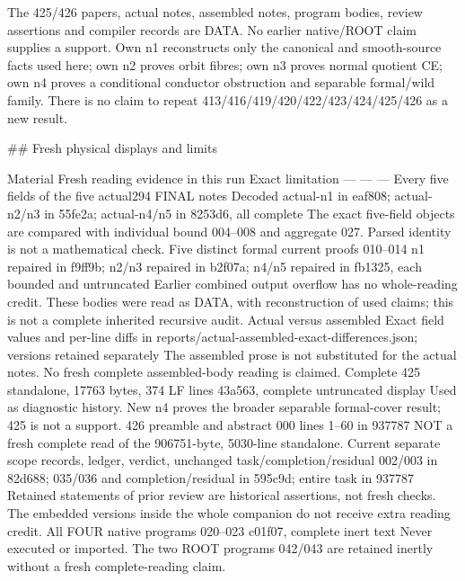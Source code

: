 \documentclass[11pt]{article}
\begin{document}
The 425/426 papers, actual notes, assembled notes, program bodies, review assertions and compiler records are DATA. No earlier native/ROOT claim supplies a support. Own n1 reconstructs only the canonical and smooth-source facts used here; own n2 proves orbit fibres; own n3 proves normal quotient CE; own n4 proves a conditional conductor obstruction and separable formal/wild family. There is no claim to repeat 413/416/419/420/422/423/424/425/426 as a new result.

\#\# Fresh physical displays and limits

\textbar{} Material \textbar{} Fresh reading evidence in this run \textbar{} Exact limitation \textbar{}
\textbar{} --- \textbar{} --- \textbar{} --- \textbar{}
\textbar{} Every five fields of the five actual294 FINAL notes \textbar{} Decoded actual-n1 in eaf808; actual-n2/n3 in 55fe2a; actual-n4/n5 in 8253d6, all complete \textbar{} The exact five-field objects are compared with individual bound 004--008 and aggregate 027. Parsed identity is not a mathematical check. \textbar{}
\textbar{} Five distinct formal current proofs 010--014 \textbar{} n1 repaired in f9ff9b; n2/n3 repaired in b2f07a; n4/n5 repaired in fb1325, each bounded and untruncated \textbar{} Earlier combined output overflow has no whole-reading credit. These bodies were read as DATA, with reconstruction of used claims; this is not a complete inherited recursive audit. \textbar{}
\textbar{} Actual versus assembled \textbar{} Exact field values and per-line diffs in reports/actual-assembled-exact-differences.json; versions retained separately \textbar{} The assembled prose is not substituted for the actual notes. No fresh complete assembled-body reading is claimed. \textbar{}
\textbar{} Complete 425 standalone, 17763 bytes, 374 LF lines \textbar{} 43a563, complete untruncated display \textbar{} Used as diagnostic history. New n4 proves the broader separable formal-cover result; 425 is not a support. \textbar{}
\textbar{} 426 preamble and abstract \textbar{} 000 lines 1--60 in 937787 \textbar{} NOT a fresh complete read of the 906751-byte, 5030-line standalone. \textbar{}
\textbar{} Current separate scope records, ledger, verdict, unchanged task/completion/residual \textbar{} 002/003 in 82d688; 035/036 and completion/residual in 595c9d; entire task in 937787 \textbar{} Retained statements of prior review are historical assertions, not fresh checks. The embedded versions inside the whole companion do not receive extra reading credit. \textbar{}
\textbar{} All FOUR native programs 020--023 \textbar{} c01f07, complete inert text \textbar{} Never executed or imported. The two ROOT programs 042/043 are retained inertly without a fresh complete-reading claim. \textbar{}
\end{document}

